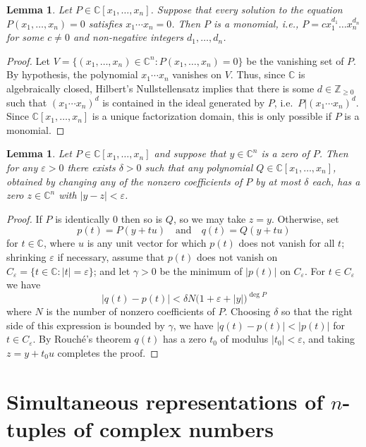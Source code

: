 \documentclass[11pt]{amsart}
\newtheorem{lemma}[theorem]{Lemma}
\theoremstyle{remark}
\numberwithin{theorem}{section}
\numberwithin{equation}{section}
\newcommand{\C}{\mathbb{C}}
\newcommand{\Z}{\mathbb{Z}}
\begin{document}
\begin{lemma}\label{lem:monomial}
Let $P\in\C[x_1,\ldots,x_n]$. Suppose that every solution to the
equation $P(x_1,\ldots,x_n)=0$ satisfies $x_1\cdots x_n=0$.
Then $P$ is a monomial, i.e., $P=cx_1^{d_1}\ldots x_n^{d_n}$ for 
some $c\neq0$ and non-negative integers $d_1,\ldots,d_n$.
\end{lemma}
\begin{proof}
Let $V=\{(x_1,\ldots,x_n)\in\C^n:P(x_1,\ldots,x_n)=0\}$ be the vanishing
set of $P$. By hypothesis, the polynomial $x_1\cdots x_n$ vanishes on
$V$. Thus, since $\C$ is algebraically closed, Hilbert's Nullstellensatz
implies that there is some $d\in\Z_{\ge0}$ such that $(x_1\cdots x_n)^d$
is contained in the ideal generated by $P$, i.e.\ $P|(x_1\cdots x_n)^d$.
Since $\C[x_1,\ldots,x_n]$ is a unique factorization domain,
this is only possible if $P$ is a monomial.
\end{proof}

\begin{lemma}\label{lem:poly_cont}
Let $P\in\C[x_1,\ldots,x_n]$ and
suppose that $y\in\C^n$ is a zero of $P$. Then for any $\varepsilon>0$ there exists
$\delta>0$ such that any polynomial $Q\in\C[x_1,\ldots,x_n]$, obtained by changing any of the nonzero coefficients
of $P$ by at most $\delta$ each, has a zero $z\in\C^n$ with $|y-z|<\varepsilon$.
\end{lemma}
\begin{proof}
If $P$ is identically $0$ then so is $Q$, so we may take $z=y$.
Otherwise, set
$$
p(t)=P(y+tu)\quad\text{and}\quad q(t)=Q(y+tu)
$$
for $t\in\C$, where $u$ is any unit vector for which 
$p(t)$ does not vanish for all $t$; shrinking $\varepsilon$ if necessary, assume that
$p(t)$ does not vanish on $C_\varepsilon=\{t\in\C:|t|=\varepsilon\}$; and
let $\gamma>0$ be the minimum of $|p(t)|$ on $C_\varepsilon$. For
$t\in C_\varepsilon$ we have
\[
|q(t) - p(t)| < \delta N \Big(1+\varepsilon+|y|\Big)^{\deg P}
\]
where $N$ is the number of nonzero coefficients of $P$. 
Choosing $\delta$ so that the right side of this expression is bounded by $\gamma$, we have
$|q(t)-p(t)|<|p(t)|$ for $t\in C_\varepsilon$.
By Rouch\'e's theorem $q(t)$ has a zero $t_0$ of modulus
$|t_0|<\varepsilon$, and taking $z=y+t_0u$ completes the proof.
\end{proof}

\section{Simultaneous representations of $n$-tuples of complex numbers}
\end{document}
